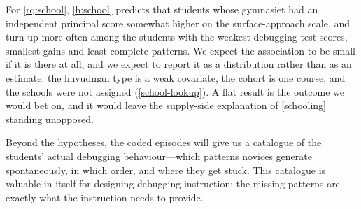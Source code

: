For \cref{rq:school}, \cref{h:school} predicts that students whose
gymnasiet had an independent principal score somewhat higher on the
surface-approach scale, and turn up more often among the students with the
weakest debugging test scores, smallest gains and least complete patterns.
We expect the association to be small if it is there at all, and we expect
to report it as a distribution rather than as an estimate: the huvudman
type is a weak covariate, the cohort is one course, and the schools were
not assigned (\cref{school-lookup}).
A flat result is the outcome we would bet on, and it would leave the
supply-side explanation of \cref{schooling} standing unopposed.

Beyond the hypotheses, the coded episodes will give us a catalogue of the
students' actual debugging behaviour---which patterns novices generate
spontaneously, in which order, and where they get stuck.
This catalogue is valuable in itself for designing debugging instruction: the
missing patterns are exactly what the instruction needs to provide.
